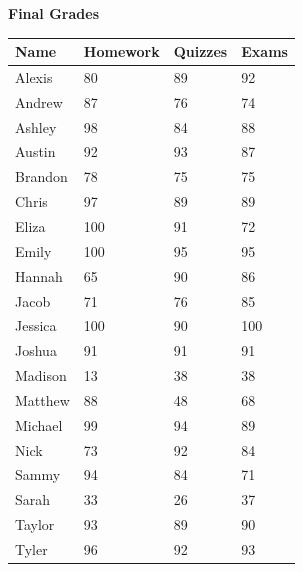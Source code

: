 \documentclass{article}
\let\oldtextbf\textbf
\renewcommand{\textbf}[1]{\textcolor{blue1}{\oldtextbf{#1}}}
\begin{document}
\begin{table}[H]
	\begin{center}
		{\large \textbf{Final Grades}}\\
		
		\small
	\begin{tabular}{|l|l|l|l|}
		\hline
		\textbf{Name} & \textbf{Homework} & \textbf{Quizzes} & \textbf{Exams} \\ \hline
		Alexis        & 80                & 89               & 92             \\ \hline
		Andrew        & 87                & 76               & 74             \\ \hline
		Ashley        & 98                & 84               & 88             \\ \hline
		Austin        & 92                & 93               & 87             \\ \hline
		Brandon       & 78                & 75               & 75             \\ \hline
		Chris	      & 97                & 89               & 89             \\ \hline
		Eliza         & 100               & 91               & 72             \\ \hline
		Emily         & 100               & 95               & 95             \\ \hline
		Hannah        & 65                & 90               & 86             \\ \hline
		Jacob         & 71                & 76               & 85             \\ \hline
		Jessica       & 100               & 90               & 100            \\ \hline
		Joshua        & 91                & 91               & 91             \\ \hline
		Madison       & 13                & 38               & 38             \\ \hline
		Matthew       & 88                & 48               & 68             \\ \hline
		Michael       & 99                & 94               & 89             \\ \hline
		Nick          & 73                & 92               & 84             \\ \hline
		Sammy         & 94                & 84               & 71             \\ \hline
		Sarah         & 33                & 26               & 37             \\ \hline
		Taylor        & 93                & 89               & 90             \\ \hline
		Tyler         & 96                & 92               & 93             \\ \hline
	\end{tabular}
\end{center}
\end{table}
\vspace{-2em}
\end{document}

